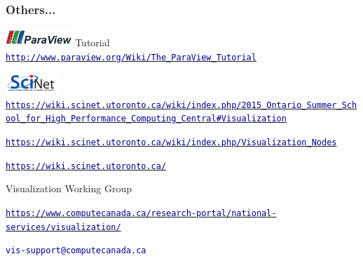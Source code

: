 \begin{frame}
\frametitle{Others...}
	\begin{beamerboxesrounded}[upper=block head,lower=block body,shadow=true]{ %
\href{http://www.paraview.org}{\includegraphics[width=2.5cm]{figs/visit-logos/ParaViewLogo}} Tutorial}
	 \href{http://www.paraview.org/Wiki/The_ParaView_Tutorial}{\textcolor{DarkBlue}{\small \tt http://www.paraview.org/Wiki/The\_ParaView\_Tutorial}}
	\end{beamerboxesrounded}

	\vspace{5mm}
	\begin{beamerboxesrounded}[upper=block head,lower=block body,shadow=true]{ \href{http://www.scinethpc.ca}{\includegraphics[width=2cm,clip=true,trim=0 0mm 0 0]{logos/SciNet_newLogo}}}
		{\small {}} \href{https://wiki.scinet.utoronto.ca/wiki/index.php/2015_Ontario_Summer_School_for_High_Performance_Computing_Central\#Visualization}{\textcolor{DarkBlue}{\tiny\tt https://wiki.scinet.utoronto.ca/wiki/index.php/2015\_Ontario\_Summer\_School\_for\_High\_Performance\_Computing\_Central\#Visualization}}

		{\small {}} \href{https://wiki.scinet.utoronto.ca/wiki/index.php/Visualization_Nodes}{\textcolor{DarkBlue}{\tiny\tt https://wiki.scinet.utoronto.ca/wiki/index.php/Visualization\_Nodes}}

		{\small{}} \href{https://wiki.scinet.utoronto.ca/}{\textcolor{DarkBlue}{\small\tt https://wiki.scinet.utoronto.ca/}}
	\end{beamerboxesrounded}



        \vspace{5mm}
        \begin{beamerboxesrounded}[upper=block head,lower=block body,shadow=true]{ Visualization Working Group}

		{\small{}} \href{https://www.computecanada.ca/research-portal/national-services/visualization/}{\textcolor{DarkBlue}{\tiny\tt https://www.computecanada.ca/research-portal/national-services/visualization/}}

		{\small{}} \textcolor{DarkBlue}{\small\tt vis-support@computecanada.ca}
        \end{beamerboxesrounded}


\end{frame}
